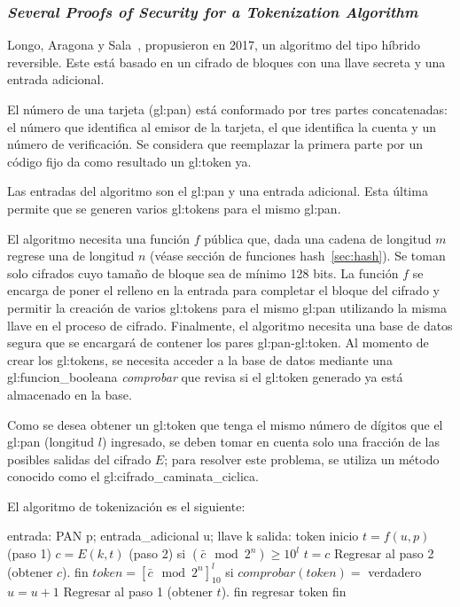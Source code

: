 %
%

\subsubsection{\textit{Several Proofs of Security for a Tokenization
  Algorithm}}

Longo, Aragona y Sala~\cite{aragona}, propusieron en 2017, un algoritmo del
tipo híbrido reversible. Este está basado en un cifrado de bloques con una
llave secreta y una entrada adicional.

El número de una tarjeta (\gls{gl:pan}) está conformado por tres partes
concatenadas: el número que identifica al emisor de la tarjeta, el que
identifica la cuenta y un número de verificación. Se considera que
reemplazar la primera parte por un código fijo da como resultado un
\gls{gl:token} ya.

Las entradas del algoritmo son el \gls{gl:pan} y una entrada adicional.
Esta última permite que se generen varios \glspl{gl:token} para el mismo
\gls{gl:pan}.

El algoritmo necesita una función $f$ pública que, dada una cadena
de longitud $m$ regrese una de longitud $n$ (véase sección de funciones 
hash~\ref{sec:hash}). Se toman solo cifrados cuyo tamaño de bloque sea de
mínimo 128 bits. La función $f$ se encarga de poner el relleno en la entrada
para completar el bloque del cifrado y permitir la creación de varios
\glspl{gl:token} para el mismo \gls{gl:pan} utilizando la misma llave en el
proceso de cifrado. Finalmente, el algoritmo necesita una base de datos segura
que se encargará de contener los pares \gls{gl:pan}-\gls{gl:token}. Al momento
de crear los \glspl{gl:token}, se necesita acceder a la base de datos
mediante una \gls{gl:funcion_booleana} \textit{comprobar} que revisa si el
\gls{gl:token} generado ya está almacenado en la base.

Como se desea obtener un \gls{gl:token} que
tenga el mismo número de dígitos que el \gls{gl:pan} (longitud $l$)
ingresado, se deben tomar en cuenta solo una fracción de las posibles salidas
del cifrado $E$; para resolver este problema, se utiliza un método conocido
como el \gls{gl:cifrado_caminata_ciclica}.

El algoritmo de tokenización es el siguiente:
\begin{pseudocodigo}[%
    caption={Híbrido reversible, método de tokenización}
  ]
  entrada: PAN p; entrada_adicional u; llave k
  salida:  token
  inicio
    $t = f(u, p)$ (paso 1)
    $c = E(k, t)$ (paso 2)
    si $(\bar{c} \mod 2^n) \geq 10^l$
      $t = c$
      Regresar al paso 2 (obtener $c$).
    fin
    $token = {[\bar{c} \mod 2^n]}^l_{10}$
    si $comprobar(token) =$ verdadero
      $u = u + 1$
      Regresar al paso 1 (obtener $t$).
    fin
    regresar token
  fin
\end{pseudocodigo}
